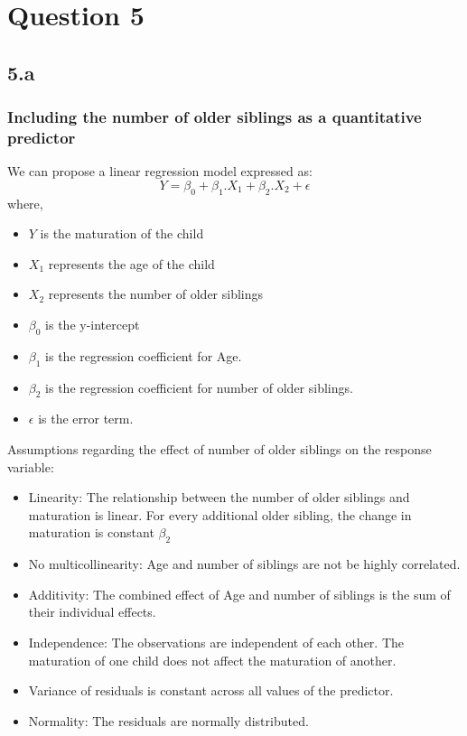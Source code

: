 \documentclass[12pt]{article}
\begin{document}
\newpage
\section*{Question 5}
\subsection*{5.a}
\subsubsection*{Including the number of older siblings as a quantitative predictor}
We can propose a linear regression model expressed as:
\[Y = \beta_0 + \beta_1. X_1 + \beta_2. X_2 + \epsilon\]
where,
\begin{itemize}
    \item \(Y\) is the maturation of the child
    \item \(X_1\) represents the age of the child
    \item \(X_2\) represents the number of older siblings
    \item \(\beta_0\) is the y-intercept
    \item \(\beta_1\) is the regression coefficient for Age.
    \item \(\beta_2\) is the regression coefficient for number of older siblings.
    \item \(\epsilon\) is the error term.
\end{itemize}
Assumptions regarding the effect of number of older siblings on the response variable:
\begin{itemize}
    \item Linearity: The relationship between the number of older siblings and
    maturation is linear. For every additional older sibling, the change in
    maturation is constant \(\beta_2\)
    \item No multicollinearity: Age and number of siblings are not be highly
    correlated.
    \item Additivity: The combined effect of Age and number of siblings is
    the sum of their individual effects.
    \item Independence: The observations are independent of each other. The
    maturation of one child does not affect the maturation of another.
    \item Variance of residuals is constant across all values of the predictor.
    \item Normality: The residuals are normally distributed.
\end{itemize}
\end{document}
